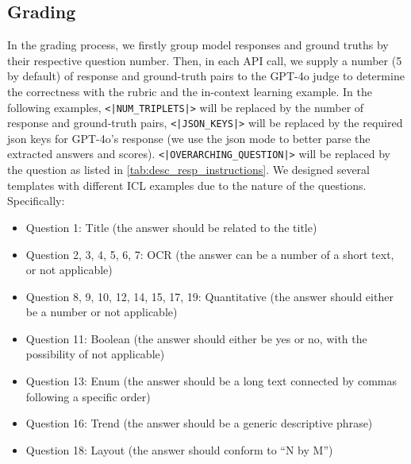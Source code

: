 \newpage
\subsection{Grading}
\label{subset:grading_desc}

In the grading process, we firstly group model responses and ground truths by their respective question number. Then, in each API call, we supply a number (5 by default) of response and ground-truth pairs to the GPT-4o judge to determine the correctness with the rubric and the in-context learning example. In the following examples, \texttt{<|NUM\_TRIPLETS|>} will be replaced by the number of response and ground-truth pairs, \texttt{<|JSON\_KEYS|>} will be replaced by the required json keys for GPT-4o's response (we use the json mode to better parse the extracted answers and scores). \texttt{<|OVERARCHING\_QUESTION|>} will be replaced by the question as listed in \cref{tab:desc_resp_instructions}. We designed several templates with different ICL examples due to the nature of the questions. Specifically:
\begin{itemize}
    \item Question 1: Title (the answer should be related to the title)
    \item Question 2, 3, 4, 5, 6, 7: OCR (the answer can be a number of a short text, or not applicable)
    \item Question 8, 9, 10, 12, 14, 15, 17, 19: Quantitative (the answer should either be a number or not applicable)
    \item Question 11: Boolean (the answer should either be yes or no, with the possibility of not applicable)
    \item Question 13: Enum (the answer should be a long text connected by commas following a specific order)
    \item Question 16: Trend (the answer should be a generic descriptive phrase)
    \item Question 18: Layout (the answer should conform to ``N by M'')
\end{itemize}

\newpage

